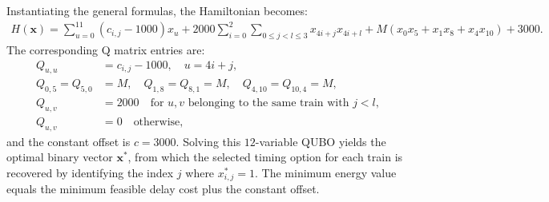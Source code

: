 \documentclass[12pt]{article}
\begin{document}
Instantiating the general formulas, the Hamiltonian becomes:
\begin{align}
H(\mathbf{x}) = \sum_{u=0}^{11} (c_{i,j} - 1000) x_u + 2000 \sum_{i=0}^{2} \sum_{0 \le j < l \le 3} x_{4i+j} x_{4i+l} + M(x_0 x_5 + x_1 x_8 + x_4 x_{10}) + 3000.
\end{align}
The corresponding Q matrix entries are:
\begin{align}
Q_{u,u} &= c_{i,j} - 1000, \quad u = 4i+j, \\
Q_{0,5} = Q_{5,0} &= M, \quad Q_{1,8} = Q_{8,1} = M, \quad Q_{4,10} = Q_{10,4} = M, \\
Q_{u,v} &= 2000 \quad \text{for } u,v \text{ belonging to the same train with } j < l, \\
Q_{u,v} &= 0 \quad \text{otherwise},
\end{align}
and the constant offset is $c = 3000$. Solving this $12$-variable QUBO yields the optimal binary vector $\mathbf{x}^*$, from which the selected timing option for each train is recovered by identifying the index $j$ where $x_{i,j}^* = 1$. The minimum energy value equals the minimum feasible delay cost plus the constant offset.
\end{document}

